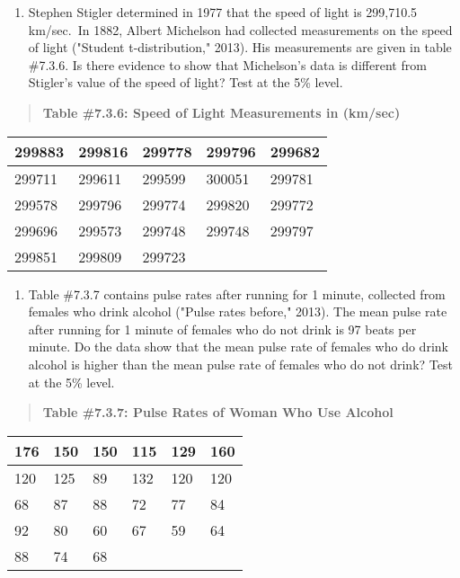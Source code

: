 \documentclass[]{book}
\providecommand{\tightlist}{%
  \setlength{\itemsep}{0pt}\setlength{\parskip}{0pt}}
\begin{document}
\begin{enumerate}
\def\labelenumi{\arabic{enumi}.}
\setcounter{enumi}{3}
\tightlist
\item
  Stephen Stigler determined in 1977 that the speed of light is
  299,710.5 km/sec.~In 1882, Albert Michelson had collected
  measurements on the speed of light ("Student t-distribution,"
  2013). His measurements are given in table \#7.3.6. Is there
  evidence to show that Michelson's data is different from Stigler's
  value of the speed of light? Test at the 5\% level.
\end{enumerate}

\begin{quote}
\textbf{Table \#7.3.6: Speed of Light Measurements in (km/sec)}
\end{quote}

\begin{longtable}[]{@{}lllll@{}}
\toprule
299883 & 299816 & 299778 & 299796 & 299682\tabularnewline
\midrule
\endhead
299711 & 299611 & 299599 & 300051 & 299781\tabularnewline
299578 & 299796 & 299774 & 299820 & 299772\tabularnewline
299696 & 299573 & 299748 & 299748 & 299797\tabularnewline
299851 & 299809 & 299723 & &\tabularnewline
\bottomrule
\end{longtable}

\begin{enumerate}
\def\labelenumi{\arabic{enumi}.}
\setcounter{enumi}{4}
\tightlist
\item
  Table \#7.3.7 contains pulse rates after running for 1 minute,
  collected from females who drink alcohol ("Pulse rates before,"
  2013). The mean pulse rate after running for 1 minute of females who
  do not drink is 97 beats per minute. Do the data show that the mean
  pulse rate of females who do drink alcohol is higher than the mean
  pulse rate of females who do not drink? Test at the 5\% level.
\end{enumerate}

\begin{quote}
\textbf{Table \#7.3.7: Pulse Rates of Woman Who Use Alcohol}
\end{quote}

\begin{longtable}[]{@{}llllll@{}}
\toprule
176 & 150 & 150 & 115 & 129 & 160\tabularnewline
\midrule
\endhead
120 & 125 & 89 & 132 & 120 & 120\tabularnewline
68 & 87 & 88 & 72 & 77 & 84\tabularnewline
92 & 80 & 60 & 67 & 59 & 64\tabularnewline
88 & 74 & 68 & & &\tabularnewline
\bottomrule
\end{longtable}
\end{document}
